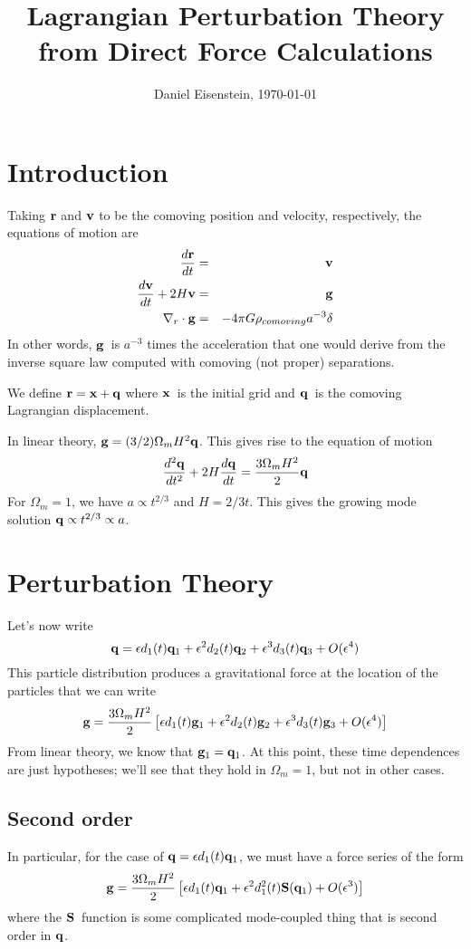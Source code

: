 \documentclass[11pt,preprint]{aastex}
\newcommand{\beq}{\begin{equation}}
\newcommand{\eeq}{\end{equation}}
\newcommand{\beqa}{\begin{eqnarray}}
\newcommand{\eeqa}{\end{eqnarray}}
\newcommand{\bfr}{\ensuremath{{\bf r}}}
\newcommand{\bfv}{\ensuremath{{\bf v}}}
\newcommand{\bfg}{\ensuremath{{\bf g}}}
\newcommand{\bfx}{\ensuremath{{\bf x}}}
\newcommand{\bfq}{\ensuremath{{\bf q}}}
\newcommand{\bfS}{\ensuremath{{\bf S}}}
\begin{document}
\title{Lagrangian Perturbation Theory from Direct Force Calculations}
\author{Daniel Eisenstein, \today}

\section{Introduction}

Taking $\bfr$ and $\bfv$ to be the comoving position and velocity,
respectively, the equations of motion are
\beqa
{d\bfr\over dt} &=& \bfv \\
{d\bfv\over dt} + 2H\bfv &=& \bfg \\
\nabla_r \cdot \bfg &=& - 4\pi G \rho_{comoving} a^{-3} \delta
\eeqa
In other words, \bfg\ is $a^{-3}$ times the acceleration that one would
derive from the inverse square law computed with comoving (not proper) 
separations.

We define $\bfr = \bfx + \bfq$ where \bfx\ is the 
initial grid and \bfq\ is the comoving Lagrangian displacement.

In linear theory, $\bfg = (3/2) \Omega_m H^2 \bfq$.  This gives rise
to the equation of motion
\beq
{d^2\bfq\over dt^2} + 2H {d\bfq\over dt} = {3\Omega_m H^2\over 2} \bfq
\eeq
For $\Omega_m = 1$, we have $a \propto t^{2/3}$ and $H = 2/3t$.  This 
gives the growing mode solution $\bfq \propto t^{2/3} \propto a$.

\section{Perturbation Theory}

Let's now write 
\beq
\bfq = \epsilon d_1(t) \bfq_1 + \epsilon^2 d_2(t) \bfq_2 + 
	\epsilon^3 d_3(t) \bfq_3 + O(\epsilon^4)
\eeq
This particle distribution produces a gravitational force at the 
location of the particles that we can write
\beq
\bfg = {3\Omega_m H^2\over 2}\left[\epsilon d_1(t) \bfg_1 + 
\epsilon^2 d_2(t) \bfg_2 + \epsilon^3 d_3(t) \bfg_3 + O(\epsilon^4) \right]
\eeq
From linear theory, we know that $\bfg_1 = \bfq_1$.
At this point, these time dependences are just hypotheses; we'll see that 
they hold in $\Omega_m=1$, but not in other cases.

\subsection{Second order}
In particular, for the case of $\bfq = \epsilon d_1(t) \bfq_1$, we must
have a force series of the form
\beq
\bfg = {3\Omega_m H^2\over 2} \left[ \epsilon d_1(t) \bfq_1
	+ \epsilon^2 d_1^2(t) \bfS(\bfq_1)
	+ O(\epsilon^3)\right]
\eeq
where the \bfS\ function is some complicated mode-coupled thing
that is second order in \bfq.  
\end{document}
